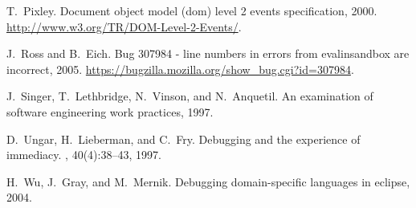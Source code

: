 \documentclass{www2010-accepted}
\begin{document}
\begin{thebibliography}{10}
T.~Pixley.
\newblock Document object model (dom) level 2 events specification, 2000.
\newblock \url{http://www.w3.org/TR/DOM-Level-2-Events/}.

J.~Ross and B.~Eich.
\newblock Bug 307984 - line numbers in errors from evalinsandbox are incorrect,
  2005.
\newblock \url{https://bugzilla.mozilla.org/show_bug.cgi?id=307984}.

J.~Singer, T.~Lethbridge, N.~Vinson, and N.~Anquetil.
\newblock An examination of software engineering work practices, 1997.

D.~Ungar, H.~Lieberman, and C.~Fry.
\newblock Debugging and the experience of immediacy.
, 40(4):38--43, 1997.

H.~Wu, J.~Gray, and M.~Mernik.
\newblock Debugging domain-specific languages in eclipse, 2004.

\end{thebibliography}
\end{document}
